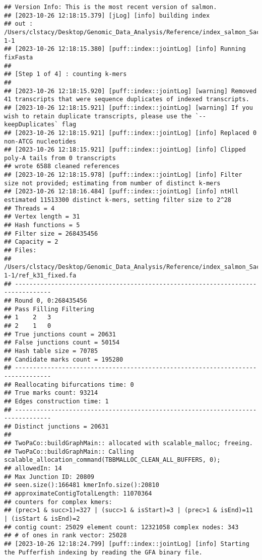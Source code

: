 \documentclass[
]{book}
\begin{document}
\begin{verbatim}
## Version Info: This is the most recent version of salmon.
## [2023-10-26 12:18:15.379] [jLog] [info] building index
## out : /Users/clstacy/Desktop/Genomic_Data_Analysis/Reference/index_salmon_Saccharomyces_cerevisiae.R64-1-1
## [2023-10-26 12:18:15.380] [puff::index::jointLog] [info] Running fixFasta
## 
## [Step 1 of 4] : counting k-mers
## 
## [2023-10-26 12:18:15.920] [puff::index::jointLog] [warning] Removed 41 transcripts that were sequence duplicates of indexed transcripts.
## [2023-10-26 12:18:15.921] [puff::index::jointLog] [warning] If you wish to retain duplicate transcripts, please use the `--keepDuplicates` flag
## [2023-10-26 12:18:15.921] [puff::index::jointLog] [info] Replaced 0 non-ATCG nucleotides
## [2023-10-26 12:18:15.921] [puff::index::jointLog] [info] Clipped poly-A tails from 0 transcripts
## wrote 6588 cleaned references
## [2023-10-26 12:18:15.978] [puff::index::jointLog] [info] Filter size not provided; estimating from number of distinct k-mers
## [2023-10-26 12:18:16.484] [puff::index::jointLog] [info] ntHll estimated 11513300 distinct k-mers, setting filter size to 2^28
## Threads = 4
## Vertex length = 31
## Hash functions = 5
## Filter size = 268435456
## Capacity = 2
## Files: 
## /Users/clstacy/Desktop/Genomic_Data_Analysis/Reference/index_salmon_Saccharomyces_cerevisiae.R64-1-1/ref_k31_fixed.fa
## --------------------------------------------------------------------------------
## Round 0, 0:268435456
## Pass Filling Filtering
## 1    2   3   
## 2    1   0
## True junctions count = 20631
## False junctions count = 50154
## Hash table size = 70785
## Candidate marks count = 195280
## --------------------------------------------------------------------------------
## Reallocating bifurcations time: 0
## True marks count: 93214
## Edges construction time: 1
## --------------------------------------------------------------------------------
## Distinct junctions = 20631
## 
## TwoPaCo::buildGraphMain:: allocated with scalable_malloc; freeing.
## TwoPaCo::buildGraphMain:: Calling scalable_allocation_command(TBBMALLOC_CLEAN_ALL_BUFFERS, 0);
## allowedIn: 14
## Max Junction ID: 20809
## seen.size():166481 kmerInfo.size():20810
## approximateContigTotalLength: 11070364
## counters for complex kmers:
## (prec>1 & succ>1)=327 | (succ>1 & isStart)=3 | (prec>1 & isEnd)=11 | (isStart & isEnd)=2
## contig count: 25029 element count: 12321058 complex nodes: 343
## # of ones in rank vector: 25028
## [2023-10-26 12:18:24.799] [puff::index::jointLog] [info] Starting the Pufferfish indexing by reading the GFA binary file.

\end{verbatim}
\end{document}
